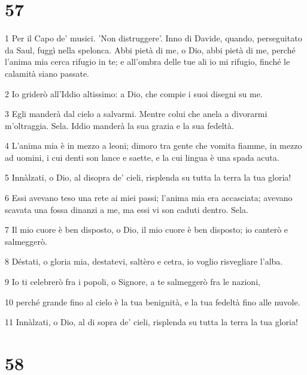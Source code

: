 \chapter{57}

\par 1 Per il Capo de' musici. 'Non distruggere'. Inno di Davide, quando, perseguitato da Saul, fuggì nella spelonca. Abbi pietà di me, o Dio, abbi pietà di me, perché l'anima mia cerca rifugio in te; e all'ombra delle tue ali io mi rifugio, finché le calamità siano passate.
\par 2 Io griderò all'Iddio altissimo: a Dio, che compie i suoi disegni su me.
\par 3 Egli manderà dal cielo a salvarmi. Mentre colui che anela a divorarmi m'oltraggia. Sela. Iddio manderà la sua grazia e la sua fedeltà.
\par 4 L'anima mia è in mezzo a leoni; dimoro tra gente che vomita fiamme, in mezzo ad uomini, i cui denti son lance e saette, e la cui lingua è una spada acuta.
\par 5 Innàlzati, o Dio, al disopra de' cieli, risplenda su tutta la terra la tua gloria!
\par 6 Essi avevano teso una rete ai miei passi; l'anima mia era accasciata; avevano scavata una fossa dinanzi a me, ma essi vi son caduti dentro. Sela.
\par 7 Il mio cuore è ben disposto, o Dio, il mio cuore è ben disposto; io canterò e salmeggerò.
\par 8 Déstati, o gloria mia, destatevi, saltèro e cetra, io voglio risvegliare l'alba.
\par 9 Io ti celebrerò fra i popoli, o Signore, a te salmeggerò fra le nazioni,
\par 10 perché grande fino al cielo è la tua benignità, e la tua fedeltà fino alle nuvole.
\par 11 Innàlzati, o Dio, al di sopra de' cieli, risplenda su tutta la terra la tua gloria!

\chapter{58}

